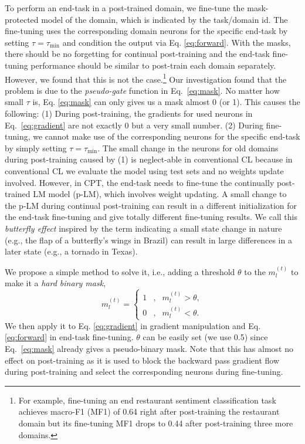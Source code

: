 \documentclass[11pt]{article}
\begin{document}
To perform an end-task in a post-trained domain, we fine-tune the mask-protected model of the domain, which is indicated by the task/domain id. The fine-tuning uses the corresponding domain neurons for the specific end-task {by setting $\tau=\tau_{\text{min}}$ and condition the output via Eq. \ref{eq:forward}}. With the masks, there should be no forgetting for continual post-training and the end-task fine-tuning performance should be similar to post-train each domain separately. However, we found that this is not the case.\footnote{For example, fine-tuning an end restaurant sentiment classification task achieves macro-F1 (MF1) of 0.64 right after post-training the restaurant domain but its fine-tuning MF1 drops to 0.44 after post-training three more domains.} Our investigation found that the problem is due to the \textit{pseudo-gate} function in Eq.~\ref{eq:mask}. No matter how small $\tau$ is, Eq. \ref{eq:mask} can only gives us a mask almost 0 (or 1). This causes the following: (1) During post-training, 
{the gradients for used neurons in Eq.~\ref{eq:gradient} are not exactly 0 but a very small number.} (2) During fine-tuning, we cannot make use of the corresponding neurons for the specific end-task by simply setting $\tau=\tau_{\text{min}}$. The small change in the neurons for old domains during post-training caused by (1) is neglect-able in conventional CL because in conventional CL we evaluate the model using test sets and no weights update involved. However, in CPT, the end-task needs to fine-tune the continually post-trained LM model (p-LM), which involves weight updating. A small change to the p-LM during continual post-training can result in a different initialization for the end-task fine-tuning and give totally different fine-tuning results. We call this \textit{butterfly effect} inspired by the term indicating a small state change in  nature (e.g., the flap of a butterfly’s wings in Brazil) can result in large differences in a later state (e.g., a tornado in Texas). 

We propose a simple method to solve it, i.e., adding a threshold $\theta$ to the $m^{(t)}_l$ to make it a \textit{hard binary mask},
\begin{equation}
\label{eq:threshold}
m^{(t)}_l =\left\{
\begin{aligned}
1 & , & m^{(t)}_l > \theta, \\
0 & , & m^{(t)}_l < \theta.
\end{aligned}
\right.
\end{equation}
We then apply it to Eq. \ref{eq:gradient} in gradient manipulation and Eq. \ref{eq:forward} in end-task fine-tuning. $\theta$ can be easily set (we use 0.5) since Eq.~\ref{eq:mask} already gives a pseudo-binary mask. Note that this has almost no effect on post-training as it is used to block the backward pass gradient flow during post-training and select the corresponding neurons during fine-tuning. 
\end{document}
